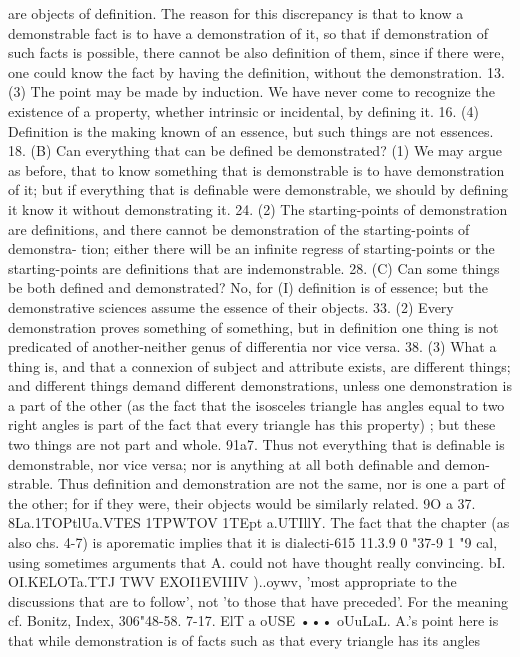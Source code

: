 {{{{{{{{{{{{{{{{{{{{{are objects of definition. The reason for this discrepancy is that
to know a demonstrable fact is to have a demonstration of it,
so that if demonstration of such facts is possible, there cannot be
also definition of them, since if there were, one could know the
fact by having the definition, without the demonstration.
13. (3) The point may be made by induction. We have never
come to recognize the existence of a property, whether intrinsic or
incidental, by defining it.
16. (4) Definition is the making known of an essence, but
such things are not essences.
18. (B) Can everything that can be defined be demonstrated?
(1) We may argue as before, that to know something that is
demonstrable is to have demonstration of it; but if everything
that is definable were demonstrable, we should by defining it
know it without demonstrating it.
24. (2) The starting-points of demonstration are definitions, and
there cannot be demonstration of the starting-points of demonstra-
tion; either there will be an infinite regress of starting-points or
the starting-points are definitions that are indemonstrable.
28. (C) Can some things be both defined and demonstrated?
No, for (I) definition is of essence; but the demonstrative sciences
assume the essence of their objects.
33. (2) Every demonstration proves something of something,
but in definition one thing is not predicated of another-neither
genus of differentia nor vice versa.
38. (3) What a thing is, and that a connexion of subject and
attribute exists, are different things; and different things demand
different demonstrations, unless one demonstration is a part of
the other (as the fact that the isosceles triangle has angles equal
to two right angles is part of the fact that every triangle has
this property) ; but these two things are not part and whole.
91a7. Thus not everything that is definable is demonstrable,
nor vice versa; nor is anything at all both definable and demon-
strable. Thus definition and demonstration are not the same,
nor is one a part of the other; for if they were, their objects would
be similarly related.
9O a 37. 8La.1TOPtlUa.VTES 1TPWTOV 1TEpt a.UTIllY. The fact that the
chapter (as also chs. 4-7) is aporematic implies that it is dialecti-615
11.3.9 0 "37-9 1 "9
cal, using sometimes arguments that A. could not have thought
really convincing.
bI. OI.KELOTa.TTJ TWV EXOI1EVIIIV )..oywv, 'most appropriate to the
discussions that are to follow', not 'to those that have preceded'.
For the meaning cf. Bonitz, Index, 306"48-58.
7-17. ElT a oUSE ••• oUuLaL. A.'s point here is that while
demonstration is of facts such as that every triangle has its angles
}}}}}}}}}}}}}}}}}}}}}
